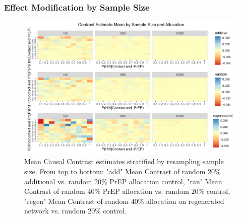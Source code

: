 \documentclass{article}
\theoremstyle{definition}
\begin{document}
\subsubsection{Effect Modification by Sample Size}
\begin{figure}[H]
    \centering
    \includegraphics[scale=0.8]{Figures/Sample size Mean plots.png}
    \caption{Mean Causal Contrast estimates stratified by resampling sample size. From top to bottom: "add" Mean Contrast of random 20\% additional vs. random 20\% PrEP allocation control, "ran" Mean Contrast of random 40\% PrEP allocation vs. random 20\% control, "regen" Mean Contrast of random 40\% allocation on regenerated network vs. random 20\% control.}
    \label{fig:Figure 9}
\end{figure}
\end{document}
